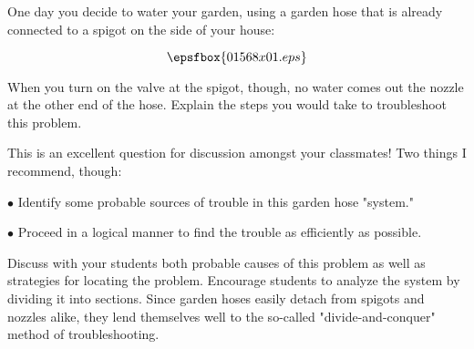 

One day you decide to water your garden, using a garden hose that is already connected to a spigot on the side of your house:

$$\epsfbox{01568x01.eps}$$

When you turn on the valve at the spigot, though, no water comes out the nozzle at the other end of the hose.  Explain the steps you would take to troubleshoot this problem.







This is an excellent question for discussion amongst your classmates!  Two things I recommend, though:

\medskip
\item{$\bullet$} Identify some probable sources of trouble in this garden hose "system."
\item{$\bullet$} Proceed in a logical manner to find the trouble as efficiently as possible.
\medskip







Discuss with your students both probable causes of this problem as well as strategies for locating the problem.  Encourage students to analyze the system by dividing it into sections.  Since garden hoses easily detach from spigots and nozzles alike, they lend themselves well to the so-called "divide-and-conquer" method of troubleshooting.




